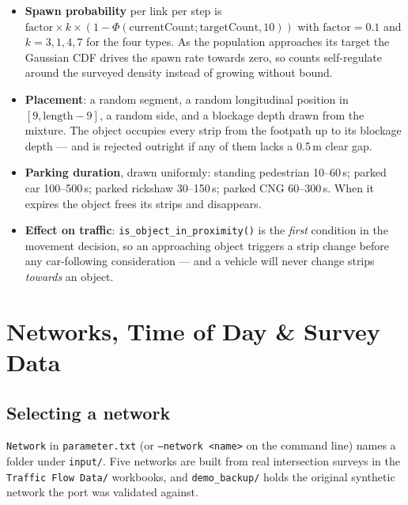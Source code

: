 \documentclass[11pt, a4paper]{article}
\newcommand{\code}[1]{\texttt{#1}}
\begin{document}
\begin{itemize}
    \item \textbf{Spawn probability} per link per step is
          $\text{factor} \times k \times
          \left(1 - \Phi(\text{currentCount}; \text{targetCount}, 10)\right)$
          with $\text{factor}=0.1$ and $k = 3, 1, 4, 7$ for the four types. As
          the population approaches its target the Gaussian CDF drives the spawn
          rate towards zero, so counts self-regulate around the surveyed density
          instead of growing without bound.
    \item \textbf{Placement}: a random segment, a random longitudinal position in
          $[9, \text{length}-9]$, a random side, and a blockage depth drawn from
          the mixture. The object occupies every strip from the footpath up to
          its blockage depth --- and is rejected outright if any of them lacks a
          0.5\,m clear gap.
    \item \textbf{Parking duration}, drawn uniformly: standing pedestrian
          10--60\,s; parked car 100--500\,s; parked rickshaw 30--150\,s; parked
          CNG 60--300\,s. When it expires the object frees its strips and
          disappears.
    \item \textbf{Effect on traffic}: \code{is\_object\_in\_proximity()} is the
          \emph{first} condition in the movement decision, so an approaching
          object triggers a strip change before any car-following consideration
          --- and a vehicle will never change strips \emph{towards} an object.
\end{itemize}

\section{Networks, Time of Day \& Survey Data}
\label{sec:networks}

\subsection{Selecting a network}

\code{Network} in \code{parameter.txt} (or \code{--network <name>} on the command
line) names a folder under \code{input/}. Five networks are built from real
intersection surveys in the \code{Traffic Flow Data/} workbooks, and
\code{demo\_backup/} holds the original synthetic network the port was validated
against.
\end{document}
